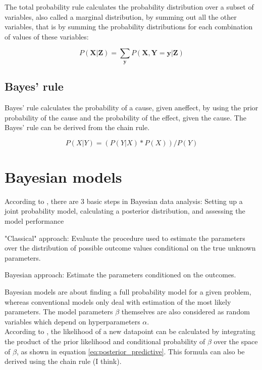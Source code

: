 \documentclass{article}
\begin{document}
The total probability rule calculates the probability distribution over a subset of variables, also called a \gls{marginal distribution}, by summing out all the other variables, that is by summing the probability distributions for each combination of values of these variables:

\begin{equation}
P(\boldsymbol X |\boldsymbol Z ) = \sum_{\boldsymbol y}   P(\boldsymbol X ,\boldsymbol Y =\boldsymbol y |\boldsymbol Z )
\end{equation} 

\subsection{Bayes' rule}

Bayes' rule calculates the probability of a cause, given aneffect, by using the prior probability of the cause and the probability of the effect, given the cause. The Bayes' rule can be derived from the chain rule.

\begin{equation}
P(X|Y) = ( P(Y|X) * P(X) ) / P(Y)
\end{equation}

\section{Bayesian models}

According to \cite{1439840954}, there are 3 basic steps in Bayesian data analysis: Setting up a joint probability model, calculating a posterior distribution, and assessing the model performance

"Classical" approach: Evaluate the procedure used to estimate the parameters over the distribution of possible outcome values conditional on the true unknown parameters.

Bayesian approach: Estimate the parameters conditioned on the outcomes.

Bayesian models are about finding a full probability model for a given problem, whereas conventional models only deal with estimation of the most likely parameters.
The model parameters $\beta$ themselves are also considered as random variables which depend on hyperparameters $\alpha$.
\\
According to \cite{Wang2018}, the likelihood of a new datapoint can be calculated by integrating the product of the prior likelihood and conditional probability of $\beta$ over the space of $\beta$, as shown in equation \ref{eq:posterior_predictive}. This formula can also be derived using the chain rule (I think).
\end{document}
